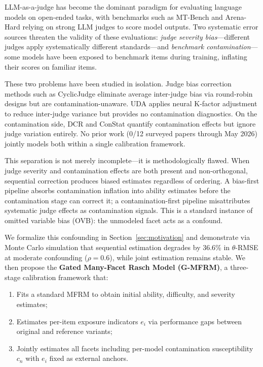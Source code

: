 \documentclass[11pt]{article}
\newcommand{\gmfrm}{G-MFRM}
\newcommand{\cn}{c_n}
\newcommand{\ei}{e_i}
\begin{document}
LLM-as-a-judge has become the dominant paradigm for evaluating language models on open-ended tasks, with benchmarks such as MT-Bench and Arena-Hard relying on strong LLM judges to score model outputs.
Two systematic error sources threaten the validity of these evaluations: \textit{judge severity bias}---different judges apply systematically different standards---and \textit{benchmark contamination}---some models have been exposed to benchmark items during training, inflating their scores on familiar items.

These two problems have been studied in isolation.
Judge bias correction methods such as CyclicJudge eliminate average inter-judge bias via round-robin designs but are contamination-unaware.
UDA applies neural K-factor adjustment to reduce inter-judge variance but provides no contamination diagnostics.
On the contamination side, DCR and ConStat quantify contamination effects but ignore judge variation entirely.
No prior work (0/12 surveyed papers through May 2026) jointly models both within a single calibration framework.

This separation is not merely incomplete---it is methodologically flawed.
When judge severity and contamination effects are both present and non-orthogonal, sequential correction produces biased estimates regardless of ordering.
A bias-first pipeline absorbs contamination inflation into ability estimates before the contamination stage can correct it; a contamination-first pipeline misattributes systematic judge effects as contamination signals.
This is a standard instance of omitted variable bias (OVB): the unmodeled facet acts as a confound.

We formalize this confounding in Section~\ref{sec:motivation} and demonstrate via Monte Carlo simulation that sequential estimation degrades by 36.6\% in $\theta$-RMSE at moderate confounding ($\rho=0.6$), while joint estimation remains stable.
We then propose the \textbf{Gated Many-Facet Rasch Model (\gmfrm{})}, a three-stage calibration framework that:
\begin{enumerate}
    \item Fits a standard MFRM to obtain initial ability, difficulty, and severity estimates;
    \item Estimates per-item exposure indicators $\ei$ via performance gaps between original and reference variants;
    \item Jointly estimates all facets including per-model contamination susceptibility $\cn$ with $\ei$ fixed as external anchors.
\end{enumerate}
\end{document}
